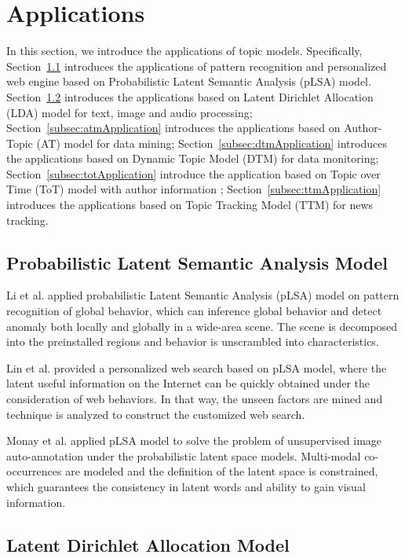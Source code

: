 \section{Applications}

In this section, we introduce the applications of topic models. Specifically, Section~\ref{subsec:plsaApplication} introduces the applications of pattern recognition and personalized web engine based on Probabilistic Latent Semantic Analysis (pLSA) model. Section~\ref{subsec:ldaApplication} introduces the applications based on Latent Dirichlet Allocation (LDA) model for text, image and audio processing; Section~\ref{subsec:atmApplication} introduces the applications based on Author-Topic (AT) model for data mining; Section~\ref{subsec:dtmApplication} introduces the applications based on Dynamic Topic Model (DTM) for data monitoring; Section~\ref{subsec:totApplication} introduce the application based on Topic over Time (ToT) model with author information ; Section~\ref{subsec:ttmApplication} introduces the applications based on Topic Tracking Model (TTM) for news tracking.

\subsection{Probabilistic Latent Semantic Analysis Model}
\label{subsec:plsaApplication}

Li et al. \cite{li2008global} applied probabilistic Latent Semantic Analysis (pLSA) model on pattern recognition of global behavior, which can inference global behavior and detect anomaly both locally and globally in a wide-area scene. The scene is decomposed into the preinstalled regions and behavior is unscrambled into characteristics.

Lin et al. \cite{lin2005using} provided a personalized web search based on pLSA model, where the latent useful information on the Internet can be quickly obtained under the consideration of web behaviors. In that way, the unseen factors are mined  and technique is analyzed to construct  the customized web search.

Monay et al. \cite{monay2004plsa} applied pLSA model to solve the problem of unsupervised image auto-annotation under the probabilistic latent space models. Multi-modal co-occurrences are modeled and the definition of the latent space is constrained, which guarantees the consistency in latent words and ability to gain visual information.

\subsection{Latent Dirichlet Allocation Model}
\label{subsec:ldaApplication}

